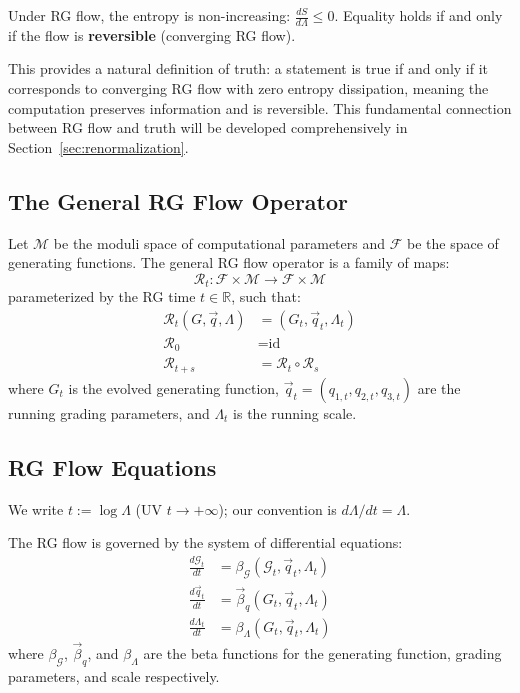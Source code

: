 \begin{theorem}
\label{thm:entropy-monotonicity}
Under RG flow, the entropy is non-increasing: $\frac{dS}{d\Lambda} \leq 0$. Equality holds if and only if the flow is \textbf{reversible} (converging RG flow).
\end{theorem}

This provides a natural definition of truth: a statement is true if and only if it corresponds to converging RG flow with zero entropy dissipation, meaning the computation preserves information and is reversible. This fundamental connection between RG flow and truth will be developed comprehensively in Section~\ref{sec:renormalization}.

\subsection{The General RG Flow Operator}

\begin{definition}
\label{def:general-rg-operator}
Let $\mathcal{M}$ be the moduli space of computational parameters and $\mathcal{F}$ be the space of generating functions. The general RG flow operator is a family of maps:
\[
\mathcal{R}_t: \mathcal{F} \times \mathcal{M} \to \mathcal{F} \times \mathcal{M}
\]
parameterized by the RG time $t \in \mathbb{R}$, such that:
\begin{align}
\mathcal{R}_t(G, \vec{q}, \Lambda) &= (G_t, \vec{q}_t, \Lambda_t) \\
\mathcal{R}_0 &= \text{id} \\
\mathcal{R}_{t+s} &= \mathcal{R}_t \circ \mathcal{R}_s
\end{align}
where $G_t$ is the evolved generating function, $\vec{q}_t = (q_{1,t}, q_{2,t}, q_{3,t})$ are the running grading parameters, and $\Lambda_t$ is the running scale.
\end{definition}

\subsection{RG Flow Equations}

We write $t:=\log \Lambda$ (UV $t\to+\infty$); our convention is $d\Lambda/dt=\Lambda$.

\begin{definition}
\label{def:rg-flow-equations}
The RG flow is governed by the system of differential equations:
\begin{align}
\frac{d\mathcal{G}_t}{dt} &= \beta_{\mathcal{G}}(\mathcal{G}_t, \vec{q}_t, \Lambda_t) \\
\frac{d\vec{q}_t}{dt} &= \vec{\beta}_q(G_t, \vec{q}_t, \Lambda_t) \\
\frac{d\Lambda_t}{dt} &= \beta_\Lambda(G_t, \vec{q}_t, \Lambda_t)
\end{align}
where $\beta_{\mathcal{G}}$, $\vec{\beta}_q$, and $\beta_\Lambda$ are the beta functions for the generating function, grading parameters, and scale respectively.
\end{definition}

